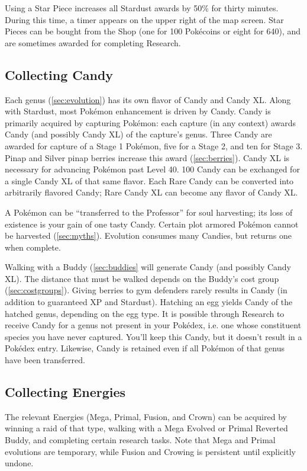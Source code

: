 Using a Star Piece increases all Stardust awards by 50\% for thirty minutes.
During this time, a timer appears on the upper right of the map screen.
Star Pieces can be bought from the Shop (one for 100 Pokécoins or eight for 640),
  and are sometimes awarded for completing Research.

\subsection{Collecting Candy}
\label{subsec:getcandy}
Each genus (\autoref{sec:evolution}) has its own flavor of Candy and Candy XL.
Along with Stardust, most Pokémon enhancement is driven by Candy.
Candy is primarily acquired by capturing Pokémon: each capture (in any context)
  awards Candy (and possibly Candy XL) of the capture's genus.
Three Candy are awarded for capture of a Stage 1 Pokémon, five for a Stage 2,
  and ten for Stage 3.
Pinap and Silver pinap berries increase this award (\autoref{sec:berries}).
Candy XL is necessary for advancing Pokémon past Level 40.
100 Candy can be exchanged for a single Candy XL of that same flavor.
Each Rare Candy can be converted into arbitrarily flavored Candy; Rare Candy XL can become any flavor of Candy XL\@.

A Pokémon can be ``transferred to the Professor'' for soul harvesting;
  its loss of existence is your gain of one tasty Candy.
Certain plot armored Pokémon cannot be harvested (\autoref{sec:myths}).
Evolution consumes many Candies, but returns one when complete.

Walking with a Buddy (\autoref{sec:buddies} will generate Candy (and possibly Candy XL).
The distance that must be walked depends on the Buddy's cost group (\autoref{sec:costgroups}).
Giving berries to gym defenders rarely results in Candy (in addition to guaranteed XP and Stardust).
Hatching an egg yields Candy of the hatched genus, depending on the egg type.
It is possible through Research to receive Candy for a genus not present in
  your Pokédex, i.e. one whose constituent species you have never captured.
You'll keep this Candy, but it doesn't result in a Pokédex entry.
Likewise, Candy is retained even if all Pokémon of that genus have been transferred.
\subsection{Collecting Energies}
The relevant Energies (Mega, Primal, Fusion, and Crown) can be acquired by winning a raid of that type,
  walking with a Mega Evolved or Primal Reverted Buddy, and completing
  certain research tasks.
Note that Mega and Primal evolutions are temporary, while Fusion and Crowing is persistent
  until explicitly undone.

